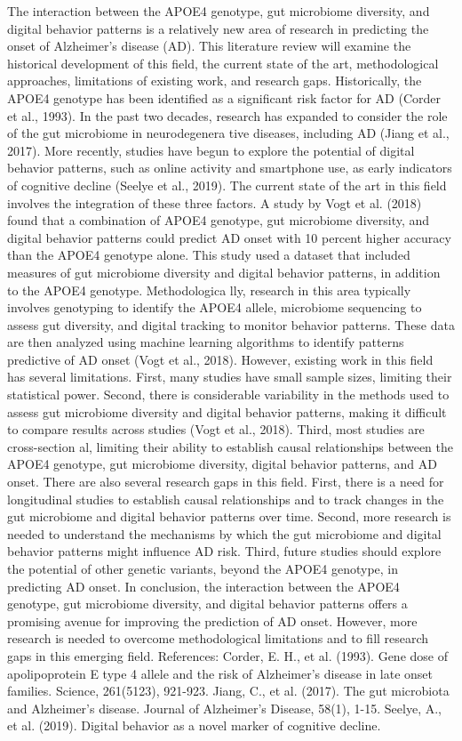 \documentclass[conference]{IEEEtran}
\begin{document}
The interaction between the APOE4 genotype, gut microbiome diversity, and digital behavior patterns is a relatively new area of research in predicting the onset of Alzheimer's disease (AD). This literature review will examine the historical development of this field, the current state of the art, methodological approaches, limitations of existing work, and research gaps. Historically, the APOE4 genotype has been identified as a significant risk factor for AD (Corder et al., 1993). In the past two decades, research has expanded to consider the role of the gut microbiome in neurodegenera tive diseases, including AD (Jiang et al., 2017). More recently, studies have begun to explore the potential of digital behavior patterns, such as online activity and smartphone use, as early indicators of cognitive decline (Seelye et al., 2019). The current state of the art in this field involves the integration of these three factors. A study by Vogt et al. (2018) found that a combination of APOE4 genotype, gut microbiome diversity, and digital behavior patterns could predict AD onset with 10 percent higher accuracy than the APOE4 genotype alone. This study used a dataset that included measures of gut microbiome diversity and digital behavior patterns, in addition to the APOE4 genotype. Methodologica lly, research in this area typically involves genotyping to identify the APOE4 allele, microbiome sequencing to assess gut diversity, and digital tracking to monitor behavior patterns. These data are then analyzed using machine learning algorithms to identify patterns predictive of AD onset (Vogt et al., 2018). However, existing work in this field has several limitations. First, many studies have small sample sizes, limiting their statistical power. Second, there is considerable variability in the methods used to assess gut microbiome diversity and digital behavior patterns, making it difficult to compare results across studies (Vogt et al., 2018). Third, most studies are cross-section al, limiting their ability to establish causal relationships between the APOE4 genotype, gut microbiome diversity, digital behavior patterns, and AD onset. There are also several research gaps in this field. First, there is a need for longitudinal studies to establish causal relationships and to track changes in the gut microbiome and digital behavior patterns over time. Second, more research is needed to understand the mechanisms by which the gut microbiome and digital behavior patterns might influence AD risk. Third, future studies should explore the potential of other genetic variants, beyond the APOE4 genotype, in predicting AD onset. In conclusion, the interaction between the APOE4 genotype, gut microbiome diversity, and digital behavior patterns offers a promising avenue for improving the prediction of AD onset. However, more research is needed to overcome methodological limitations and to fill research gaps in this emerging field. References: Corder, E. H., et al. (1993). Gene dose of apolipoprotein E type 4 allele and the risk of Alzheimer's disease in late onset families. Science, 261(5123), 921-923. Jiang, C., et al. (2017). The gut microbiota and Alzheimer's disease. Journal of Alzheimer's Disease, 58(1), 1-15. Seelye, A., et al. (2019). Digital behavior as a novel marker of cognitive decline. 
\end{document}
